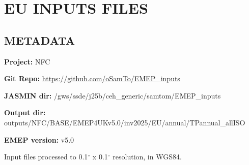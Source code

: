 \documentclass[
]{article}
\begin{document}
\newpage

\section{EU INPUTS FILES}\label{eu-inputs-files}

\subsection{METADATA}\label{metadata-1}

\textbf{Project:} NFC

\textbf{Git Repo:} \url{https://github.com/oSamTo/EMEP_inputs}

\textbf{JASMIN dir:} /gws/ssde/j25b/ceh\_generic/samtom/EMEP\_inputs

\textbf{Output dir:}
outputs/NFC/BASE/EMEP4UKv5.0/inv2025/EU/annual/TPannual\_allISO

\textbf{EMEP version:} v5.0

\vspace{\baselineskip}

Input files processed to 0.1\(^\circ\) x 0.1\(^\circ\) resolution, in
WGS84.

\vspace{\baselineskip}
\end{document}
